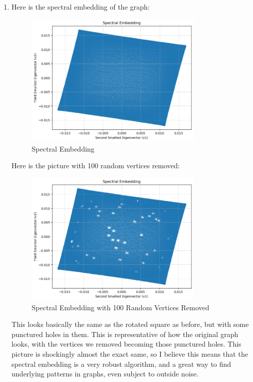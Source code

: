 \documentclass[12pt]{article}
\begin{document}
\begin{enumerate}[leftmargin=\labelsep, label=(\alph*)]
        \item Here is the spectral embedding of the graph:
        \begin{figure}[H]
            \centering
            \includegraphics[width=0.8\textwidth]{diamond.png}
            \caption{Spectral Embedding}
        \end{figure}
        Here is the picture with 100 random vertices removed:
        \begin{figure}[H]
            \centering
            \includegraphics[width=0.8\textwidth]{diamond_holes.png}
            \caption{Spectral Embedding with 100 Random Vertices Removed}
        \end{figure}
        This looks basically the same as the rotated square as before, but with some punctured holes in them. This is representative of how the original graph looks, with the vertices we removed becoming those punctured holes. This picture is shockingly almost the exact same, so I believe this means that the spectral embedding is a very robust algorithm, and a great way to find underlying patterns in graphs, even subject to outside noise.
    \end{enumerate}
\end{document}
